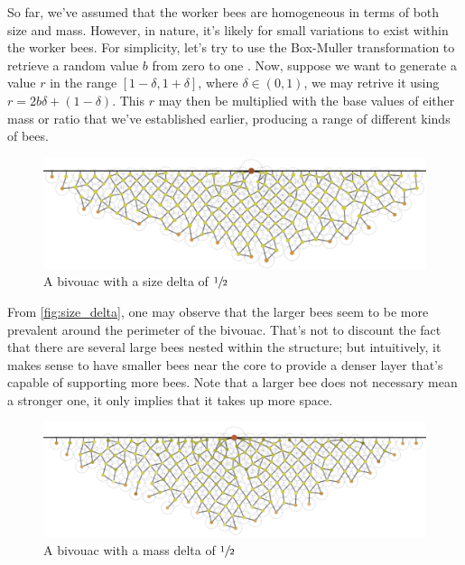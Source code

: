 \documentclass[a4paper,10pt]{article}
\begin{document}
\begin{multicols}{2}
    So far, we've assumed that the worker bees are homogeneous in terms of both size and mass. However,
    in nature, it's likely for small variations to exist within the worker bees. For simplicity, let's try
    to use the Box-Muller transformation to retrieve a random value $b$ from zero to one \cite{box1958note}.
    Now, suppose we want to generate a value $r$ in the range $[1-\delta, 1+\delta]$, where $\delta \in (0, 1)$, we may retrive
    it using $r = 2b\delta + (1 - \delta)$. This $r$ may then be multiplied with the base values
    of either mass or ratio that we've established earlier, producing a range of different kinds of bees.

    \begin{figure}[H]
        \centering
        \includegraphics[width=\linewidth]{size_delta.pdf}
        \caption{A bivouac with a size delta of $\sfrac{1}{2}$}
        \label{fig:size_delta}
    \end{figure}

    From \autoref{fig:size_delta}, one may observe that the larger bees seem to be more prevalent around
    the perimeter of the bivouac. That's not to discount the fact that there are several large bees nested
    within the structure; but intuitively, it makes sense to have smaller bees near the core to provide
    a denser layer that's capable of supporting more bees. Note that a larger bee does not necessary
    mean a stronger one, it only implies that it takes up more space.

    \begin{figure}[H]
        \centering
        \includegraphics[width=\linewidth]{mass_delta.pdf}
        \caption{A bivouac with a mass delta of $\sfrac{1}{2}$}
        \label{fig:mass_delta}
    \end{figure}


\end{multicols}
\end{document}
